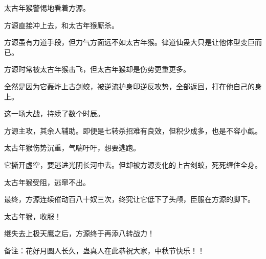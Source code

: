 \begin{this_body}
太古年猴警惕地看着方源。

方源直接冲上去，和太古年猴厮杀。

方源虽有力道手段，但力气方面远不如太古年猴。律道仙蛊大只是让他体型变巨而已。

方源时常被太古年猴击飞，但太古年猴却是伤势更重更多。

全然是因为它轰炸上古剑蛟，被逆流护身印逆反攻势，全部返回，打在他自己的身上。

这一场大战，持续了数个时辰。

方源主攻，其余人辅助。即便是七转杀招难有良效，但积少成多，也是不容小觑。

太古年猴伤势沉重，气喘吁吁，想要逃跑。

它撕开虚空，要逃进光阴长河中去。但却被方源变化的上古剑蛟，死死缠住全身。

太古年猴受阻，逃窜不出。

最终，方源连续催动百八十奴三次，终究让它低下了头颅，臣服在方源的脚下。

太古年猴，收服！

继失去上极天鹰之后，方源终于再添八转战力！

备注：花好月圆人长久，蛊真人在此恭祝大家，中秋节快乐！！

\end{this_body}


